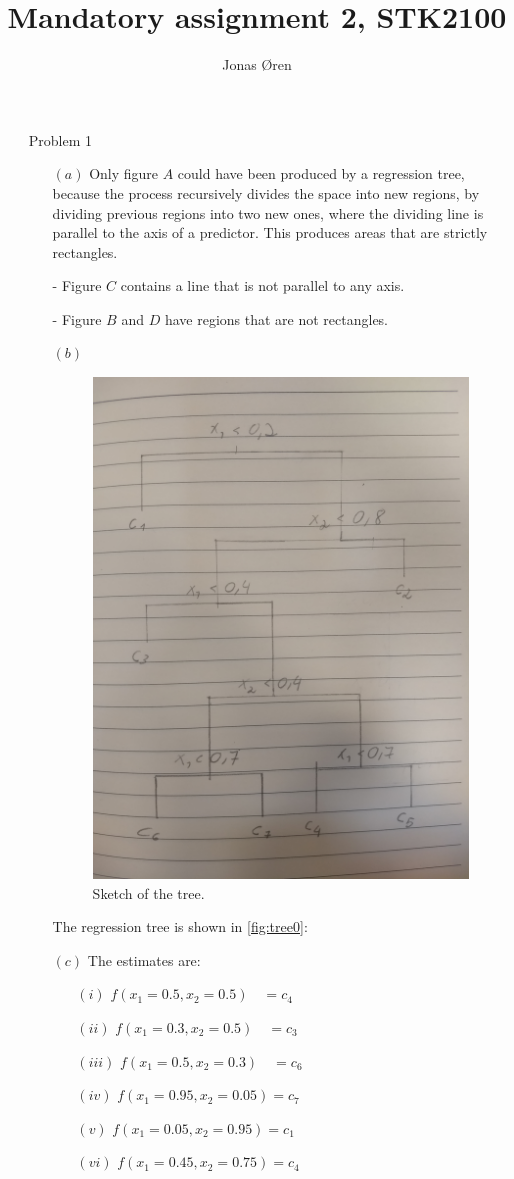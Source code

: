 \documentclass[a4paper, 10pt, english]{article}
\begin{document}
\author{Jonas Øren}
\title{Mandatory assignment 2, STK2100}
\maketitle

\begin{itemize}

\item [Problem 1]
    \begin{enumerate}
	\item[$(a)$] 
	    Only figure $A$ could have been produced by a regression tree, because the process
	    recursively divides the space into new regions, by dividing previous regions into
	    two new ones, where the dividing line is parallel to the axis of a predictor.
	    This produces areas that are strictly rectangles.

	    - Figure $C$ contains a line that is not parallel to any axis.

	    - Figure $B$ and $D$ have regions that are not rectangles.

	\item[$(b)$] 
	    \begin{figure}[H]
		\centering
		\includegraphics[width=0.6\linewidth]{r-script/plots/tree0.jpg}
		\caption{Sketch of the tree.}
		\label{fig:tree0}
	    \end{figure}
	    The regression tree is shown in \vref{fig:tree0}:


	\item[$(c)$] 
	    The estimates are:
	    \begin{itemize}
		\item[$(i)$] $f(x_1 = 0.5, x_2=0.5) \quad=  c_4$
		\item[$(ii)$] $f(x_1 = 0.3, x_2=0.5) \quad=  c_3$
		\item[$(iii)$] $f(x_1 = 0.5, x_2=0.3) \quad=  c_6$
		\item[$(iv)$] $f(x_1 = 0.95, x_2=0.05)  =  c_7$
		\item[$(v)$] $f(x_1 = 0.05, x_2=0.95)  =  c_1$
		\item[$(vi)$] $f(x_1 = 0.45, x_2=0.75)  =  c_4$
	    \end{itemize}
    \end{enumerate}


\end{itemize}
\end{document}
